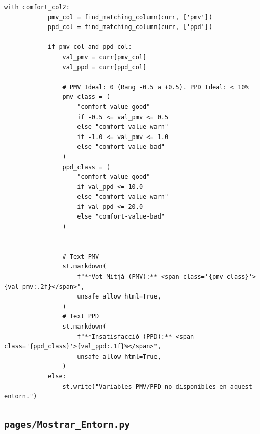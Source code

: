 \documentclass[10pt,a4paper]{article}
\begin{document}
\begin{lstlisting}[style=studioPython,caption={pages/Interaccionar\_amb\_l'Agent.py},label={lst:pages-interaccionar-amb-l-agent-py}]
        with comfort_col2:
            pmv_col = find_matching_column(curr, ['pmv'])
            ppd_col = find_matching_column(curr, ['ppd'])

            if pmv_col and ppd_col:
                val_pmv = curr[pmv_col]
                val_ppd = curr[ppd_col]

                # PMV Ideal: 0 (Rang -0.5 a +0.5). PPD Ideal: < 10%
                pmv_class = (
                    "comfort-value-good"
                    if -0.5 <= val_pmv <= 0.5
                    else "comfort-value-warn"
                    if -1.0 <= val_pmv <= 1.0
                    else "comfort-value-bad"
                )
                ppd_class = (
                    "comfort-value-good"
                    if val_ppd <= 10.0
                    else "comfort-value-warn"
                    if val_ppd <= 20.0
                    else "comfort-value-bad"
                )


                # Text PMV
                st.markdown(
                    f"**Vot Mitjà (PMV):** <span class='{pmv_class}'>{val_pmv:.2f}</span>",
                    unsafe_allow_html=True,
                )
                # Text PPD
                st.markdown(
                    f"**Insatisfacció (PPD):** <span class='{ppd_class}'>{val_ppd:.1f}%</span>",
                    unsafe_allow_html=True,
                )
            else:
                st.write("Variables PMV/PPD no disponibles en aquest entorn.")
\end{lstlisting}


\subsection{\texorpdfstring{\texttt{pages/Mostrar\_Entorn.py}}{pages/Mostrar\_Entorn.py}}
\end{document}
